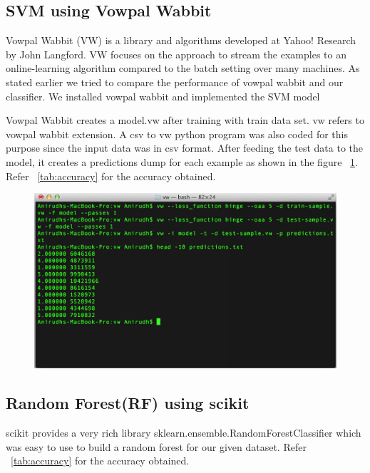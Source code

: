 \documentclass[letterpaper,twocolumn,11pt]{article}
\begin{document}
\subsection{SVM using Vowpal Wabbit}
Vowpal Wabbit (VW) \cite{vowpalwabbitwiki} is a library and algorithms developed at Yahoo! Research by John Langford. VW focuses on  the  approach  to  stream  the  examples  to  an  online-learning algorithm compared to the batch setting over many machines. As stated earlier we tried to compare the performance of vowpal wabbit and our classifier. We installed vowpal wabbit and implemented the SVM model

Vowpal Wabbit creates a model.vw after training with train data set. vw refers to vowpal wabbit extension. A csv to vw python program was also coded for this purpose since the input data was in csv format. After feeding the test data to the model, it creates a predictions dump for each example as shown in the figure ~\ref{fig:vw}. Refer ~\ref{tab:accuracy} for the accuracy obtained.

\begin{figure}[H]
\begin{center}
\includegraphics[width=1\linewidth]{vw.png}
\label{fig:vw}
\end{center}
\end{figure}

\subsection{Random Forest(RF) using scikit}
scikit provides a very rich library sklearn.ensemble.RandomForestClassifier which was easy to use to build a random forest for our given dataset. Refer ~\ref{tab:accuracy} for the accuracy obtained.
\end{document}
